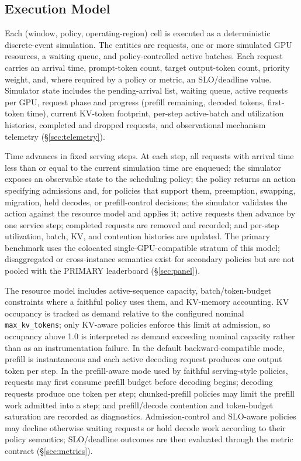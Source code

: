 \subsection{Execution Model}
\label{sec:execution-model}

Each (window, policy, operating-region) cell is executed as a deterministic
discrete-event simulation. The entities are requests, one or more simulated
GPU resources, a waiting queue, and policy-controlled active batches. Each
request carries an arrival time, prompt-token count, target output-token
count, priority weight, and, where required by a policy or metric, an
SLO/deadline value. Simulator state includes the pending-arrival list,
waiting queue, active requests per GPU, request phase and progress
(prefill remaining, decoded tokens, first-token time), current KV-token
footprint, per-step active-batch and utilization histories, completed and
dropped requests, and observational mechanism telemetry
(\S\ref{sec:telemetry}).

Time advances in fixed serving steps. At each step, all requests with
arrival time less than or equal to the current simulation time are enqueued;
the simulator exposes an observable state to the scheduling policy; the
policy returns an action specifying admissions and, for policies that support
them, preemption, swapping, migration, held decodes, or prefill-control
decisions; the simulator validates the action against the resource model and
applies it; active requests then advance by one service step; completed
requests are removed and recorded; and per-step utilization, batch, KV, and
contention histories are updated. The primary benchmark uses the colocated
single-GPU-compatible stratum of this model; disaggregated or cross-instance
semantics exist for secondary policies but are not pooled with the PRIMARY
leaderboard (\S\ref{sec:panel}).

The resource model includes active-sequence capacity, batch/token-budget
constraints where a faithful policy uses them, and KV-memory accounting.
KV occupancy is tracked as demand relative to the configured nominal
\texttt{max\_kv\_tokens}; only KV-aware policies enforce this limit at
admission, so occupancy above 1.0 is interpreted as demand exceeding nominal
capacity rather than as an instrumentation failure. In the default
backward-compatible mode, prefill is instantaneous and each active decoding
request produces one output token per step. In the prefill-aware mode used
by faithful serving-style policies, requests may first consume prefill
budget before decoding begins; decoding requests produce one token per step;
chunked-prefill policies may limit the prefill work admitted into a step;
and prefill/decode contention and token-budget saturation are recorded as
diagnostics. Admission-control and SLO-aware policies may decline otherwise
waiting requests or hold decode work according to their policy semantics;
SLO/deadline outcomes are then evaluated through the metric contract
(\S\ref{sec:metrics}).

